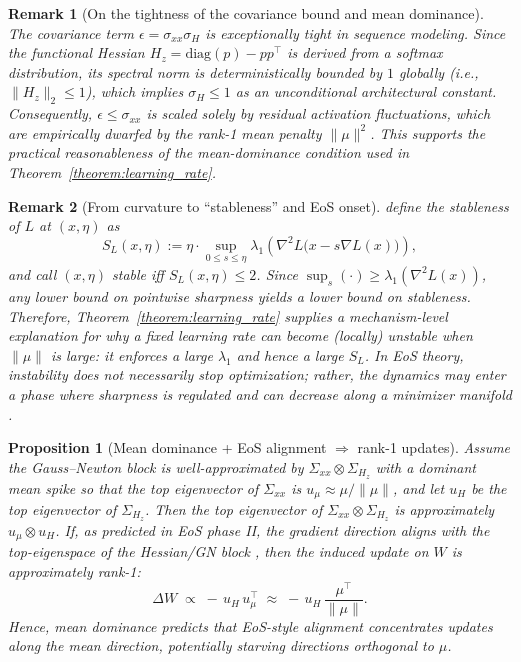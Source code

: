 \documentclass[11pt]{article}
\newtheorem{proposition}{Proposition}
\newtheorem{remark}{Remark}
\begin{document}
\begin{remark}[On the tightness of the covariance bound and mean dominance]\label{remark:epsilon_tight}
The covariance term $\epsilon=\sigma_{xx}\sigma_H$ is exceptionally tight in sequence modeling.
Since the functional Hessian $H_z=\mathrm{diag}(p)-pp^\top$ is derived from a softmax distribution, its spectral norm is deterministically bounded by $1$ globally (i.e., $\|H_z\|_2\le 1$), which implies $\sigma_H\le 1$ as an unconditional architectural constant.
Consequently, $\epsilon\le\sigma_{xx}$ is scaled solely by residual activation fluctuations, which are empirically dwarfed by the rank-1 mean penalty $\|\mu\|^2$.
This supports the practical reasonableness of the mean-dominance condition used in Theorem~\ref{theorem:learning_rate}.
\end{remark}

\begin{remark}[From curvature to ``stableness'' and EoS onset]
\label{remark:stableness}
\citet{arora2022understanding} define the \emph{stableness} of $L$ at $(x,\eta)$ as
\[
S_L(x,\eta)
:=\eta\cdot\sup_{0\le s\le \eta}\lambda_1\!\left(\nabla^2L\bigl(x-s\nabla L(x)\bigr)\right),
\]
and call $(x,\eta)$ stable iff $S_L(x,\eta)\le 2$.
Since $\sup_{s}(\cdot)\ge \lambda_1(\nabla^2L(x))$, any lower bound on pointwise sharpness yields a lower bound on stableness.
Therefore, Theorem~\ref{theorem:learning_rate} supplies a \emph{mechanism-level} explanation for why a fixed learning rate can become (locally) unstable when $\|\mu\|$ is large: it enforces a large $\lambda_1$ and hence a large $S_L$.
In EoS theory, instability does not necessarily stop optimization; rather, the dynamics may enter a phase where sharpness is regulated and can decrease along a minimizer manifold \citep{arora2022understanding}.
\end{remark}

\begin{proposition}[Mean dominance + EoS alignment $\Rightarrow$ rank-1 updates]
\label{prop:rank1update}
Assume the Gauss--Newton block is well-approximated by $\Sigma_{xx}\otimes\Sigma_{H_z}$ with a dominant mean spike so that the top eigenvector of $\Sigma_{xx}$ is $u_\mu\approx \mu/\|\mu\|$, and let $u_H$ be the top eigenvector of $\Sigma_{H_z}$.
Then the top eigenvector of $\Sigma_{xx}\otimes\Sigma_{H_z}$ is approximately $u_\mu\otimes u_H$.
If, as predicted in EoS phase II, the gradient direction aligns with the top-eigenspace of the Hessian/GN block \citep{arora2022understanding}, then the induced update on $W$ is approximately rank-1:
\[
\Delta W \;\propto\;
-\,u_H\,u_\mu^\top \;\approx\; -\,u_H\,\frac{\mu^\top}{\|\mu\|}.
\]
Hence, mean dominance predicts that EoS-style alignment concentrates updates along the mean direction, potentially starving directions orthogonal to $\mu$.
\end{proposition}
\end{document}
